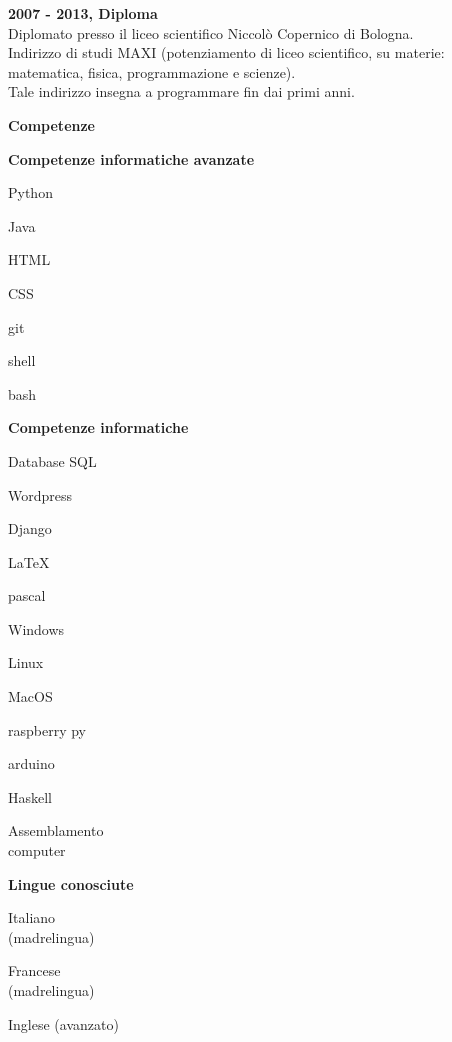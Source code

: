 \documentclass[a4paper,12pt,final]{memoir}
\newcommand{\Sep}{\vspace{1.5em}}
\newcommand{\SmallSep}{\vspace{0.5em}}
\newcommand{\CVSection}[1]
	{\Large\textbf{#1}\par
	\SmallSep\normalsize\normalfont}
\newcommand{\CVItem}[1]
	{\textbf{\color{RoyalBlue} #1}}
\begin{document}
\CVItem{2007 - 2013, Diploma}\\
	Diplomato presso il liceo scientifico Niccolò Copernico di Bologna.\\
	Indirizzo di studi MAXI (potenziamento di liceo scientifico, su materie: matematica, fisica, programmazione e scienze).\\
	Tale indirizzo insegna a programmare fin dai primi anni. 
\Sep

\CVSection{Competenze}
\CVItem{Competenze informatiche avanzate}
\begin{multicols}{3}
\begin{compactitem}[\color{RoyalBlue}$\circ$]
	\item Python 
	\item Java
	\item HTML
	\item CSS
	\item git
	\item shell
	\item bash
\end{compactitem}
\end{multicols}
\SmallSep

\clearpage
\framebreak
\framebreak

\CVItem{Competenze informatiche}
\begin{multicols}{3}
\begin{compactitem}[\color{RoyalBlue}$\circ$]
	\item Database SQL
	\item Wordpress
	\item Django
	\item \LaTeX
	\item pascal
	\item Windows
	\item Linux
	\item MacOS
	\item raspberry py
	\item arduino
	\item Haskell
	\item Assemblamento\\computer
\end{compactitem}
\end{multicols}
\SmallSep

\CVItem{Lingue conosciute}
\begin{multicols}{3}
\begin{compactitem}[\color{RoyalBlue}$\circ$]
	\item Italiano\\(madrelingua)
	\item Francese\\(madrelingua)
	\item Inglese (avanzato)
\end{compactitem}
\end{multicols}
\Sep 
\end{document}

